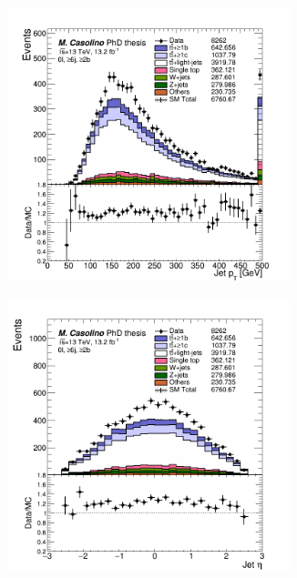\begin{figure}[p]
\begin{subfigure}{0.33\textwidth}
  \caption{}
  \label{}
\end{subfigure}
\begin{subfigure}{0.33\textwidth}
  \centering
  \includegraphics[width=0.9\textwidth]{figures/VLQ/presel/0lep/canv_c0l2b_jet0_pt.png}
  \caption{}
  \label{}
\end{subfigure}
\begin{subfigure}{0.33\textwidth}
  \centering
  \includegraphics[width=0.9\textwidth]{figures/VLQ/presel/0lep/canv_c0l2b_jet0_eta.png}

\end{subfigure}
\end{figure}
